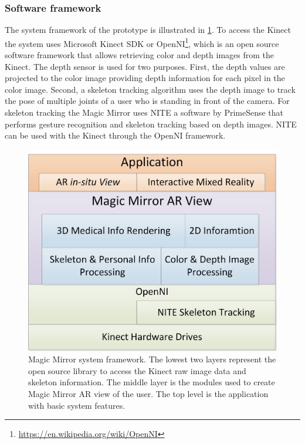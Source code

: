\subsubsection{Software framework}
The system framework of the prototype is illustrated in \figurename{\ref{fig:3-MMC:systemFramework}}.
To access the Kinect the system uses Microsoft Kinect SDK or OpenNI\footnote{\url{https://en.wikipedia.org/wiki/OpenNI}}, which is an open source software framework that allows retrieving color and depth images from the Kinect. The depth sensor is used for two purposes. First, the depth values are projected to the color image providing depth information for each pixel in the color image. Second, a skeleton tracking algorithm uses the depth image to track the pose of multiple joints of a user who is standing in front of the camera. For skeleton tracking the Magic Mirror uses NITE a software by PrimeSense that performs gesture recognition and skeleton tracking based on depth images. NITE can be used with the Kinect through the OpenNI framework.
\begin{figure}
	\centering
	\includegraphics[width = 0.7\linewidth]{figures/3-MMC/SystemFramework}
	\caption[Magic Mirror system framework]{Magic Mirror system framework. The lowest two layers represent the open source library to access the Kinect raw image data and skeleton information. The middle layer is the modules used to create Magic Mirror AR view of the user. The top level is the application with basic system features.}
	\label{fig:3-MMC:systemFramework}
\end{figure}

